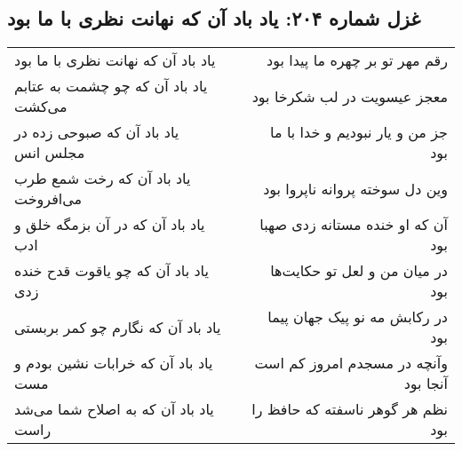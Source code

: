 \begin{center}
\section*{غزل شماره ۲۰۴: یاد باد آن که نهانت نظری با ما بود}
\label{sec:sh204}
\begin{longtable}{l p{0.5cm} r}
یاد باد آن که نهانت نظری با ما بود
&&
رقم مهر تو بر چهره ما پیدا بود
\\
یاد باد آن که چو چشمت به عتابم می‌کشت
&&
معجز عیسویت در لب شکرخا بود
\\
یاد باد آن که صبوحی زده در مجلس انس
&&
جز من و یار نبودیم و خدا با ما بود
\\
یاد باد آن که رخت شمع طرب می‌افروخت
&&
وین دل سوخته پروانه ناپروا بود
\\
یاد باد آن که در آن بزمگه خلق و ادب
&&
آن که او خنده مستانه زدی صهبا بود
\\
یاد باد آن که چو یاقوت قدح خنده زدی
&&
در میان من و لعل تو حکایت‌ها بود
\\
یاد باد آن که نگارم چو کمر بربستی
&&
در رکابش مه نو پیک جهان پیما بود
\\
یاد باد آن که خرابات نشین بودم و مست
&&
وآنچه در مسجدم امروز کم است آنجا بود
\\
یاد باد آن که به اصلاح شما می‌شد راست
&&
نظم هر گوهر ناسفته که حافظ را بود
\\
\end{longtable}
\end{center}
